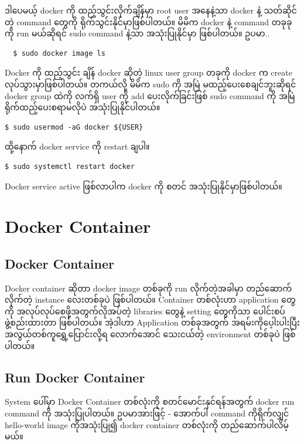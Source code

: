 \documentclass{article}
\begin{document}
ဒါပေမယ့် docker ကို ထည့်သွင်းလိုက်ချိန်မှာ root user အနေနဲ့သာ docker နဲ့
သတ်ဆိုင်တဲ့ command တွေကို ရိုက်သွင်းနိုင်မှာဖြစ်ပါတယ်။ မိမိက docker နဲ့
command တခုခုကို run မယ်ဆိုရင် sudo command နဲ့သာ အသုံးပြုနိုင်မှာ
ဖြစ်ပါတယ်။ ဥပမာ..

\begin{verbatim}
  $ sudo docker image ls
\end{verbatim}

Docker ကို ထည့်သွင်း ချိန် docker ဆိုတဲ့ linux user group တခုကို docker
က create လုပ်သွားမှာဖြစ်ပါတယ်။ တကယ်လို့ မိမိက sudo ကို အမြဲ
မထည့်ပေးစေချင်ဘူးဆိုရင် docker group ထဲကို လက်ရှိ user ကို add
ပေးလိုက်ခြင်းဖြစ် sudo command ကို အမြဲရိုက်ထည့်ပေးစရာမလိုပဲ
အသုံးပြုနိုင်ပါတယ်။

\begin{verbatim}
$ sudo usermod -aG docker ${USER}
\end{verbatim}

ထို့နောက် docker service ကို restart ချပါ။

\begin{verbatim}
$ sudo systemctl restart docker
\end{verbatim}

Docker service active ဖြစ်လာပါက docker ကို စတင်
အသုံးပြုနိုင်မှာဖြစ်ပါတယ်။

\pagebreak

\section{Docker Container}\label{docker-container-1}

\subsection{Docker Container}\label{docker-container-2}

Docker container ဆိုတာ docker image တစ်ခုကို run လိုက်တဲ့အခါမှာ
တည်ဆောက်လိုက်တဲ့ instance လေးတစ်ခုပဲ ဖြစ်ပါတယ်။ Container တစ်လုံးဟာ
application တွေကို အလုပ်လုပ်စေဖို့အတွက်လိုအပ်တဲ့ libraries တွေနဲ့
setting တွေကိုသာ ပေါင်းစပ်ဖွဲ့စည်းထားတာ ဖြစ်ပါတယ်။ အဲ့ဒါဟာ Application
တစ်ခုအတွက် အရမ်းကိုပေ့ါးပါးပြီး အလွယ်တစ်ကူရွှေ့ပြောင်းလို့ရ လောက်အောင်
သေးငယ်တဲ့ environment တစ်ခုပဲ ဖြစ်ပါတယ်။

\subsection{Run Docker Container}\label{run-docker-container}

System ပေါ်မှာ Docker Container တစ်လုံးကို စတင်မောင်းနှင်ရန်အတွက် docker
run command ကို အသုံးပြုပါတယ်။ ဥပမာအားဖြင့် - အောက်ပါ command
ကိုရိုက်လျှင် hello-world image ကိုအသုံးပြု၍ docker container တစ်လုံးကို
တည်ဆောက်ပါလိမ့်မယ်။
\end{document}
